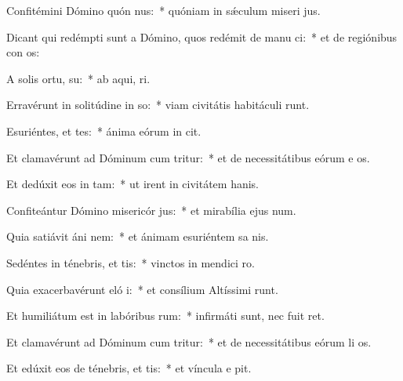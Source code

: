 \item Confitémini Dómino quón nus:~* quóniam in sǽculum miseri jus.
\item Dicant qui redémpti sunt a Dómino, quos redémit de manu ci:~* et de regiónibus con os:
\item A solis ortu,  su:~* ab aqui,  ri.
\item Erravérunt in solitúdine in so:~* viam civitátis habitáculi  runt.
\item Esuriéntes, et tes:~* ánima eórum in  cit.
\item Et clamavérunt ad Dóminum cum tritur:~* et de necessitátibus eórum e os.
\item Et dedúxit eos in  tam:~* ut irent in civitátem hanis.
\item Confiteántur Dómino misericór jus:~* et mirabília ejus  num.
\item Quia satiávit áni nem:~* et ánimam esuriéntem sa nis.
\item Sedéntes in ténebris, et  tis:~* vinctos in mendici  ro.
\item Quia exacerbavérunt eló i:~* et consílium Altíssimi runt.
\item Et humiliátum est in labóribus  rum:~* infirmáti sunt, nec fuit  ret.
\item Et clamavérunt ad Dóminum cum tritur:~* et de necessitátibus eórum li os.
\item Et edúxit eos de ténebris, et  tis:~* et víncula e pit.
